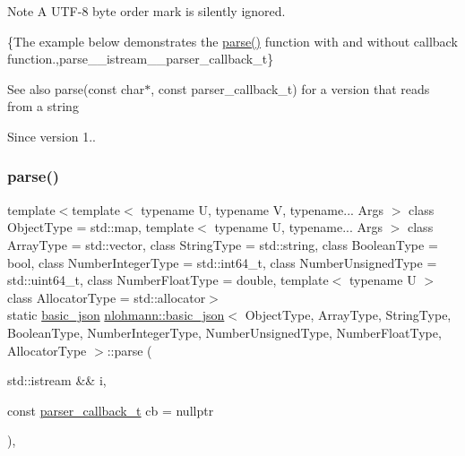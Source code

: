 \begin{DoxyNote}{Note}
A U\+T\+F-\/8 byte order mark is silently ignored.
\end{DoxyNote}
\{The example below demonstrates the {\ttfamily \hyperlink{classnlohmann_1_1basic__json_ace63ac4eb1dd7251a259d32e397461a3}{parse()}} function with and without callback function.,parse\+\_\+\+\_\+istream\+\_\+\+\_\+parser\+\_\+callback\+\_\+t\}

\begin{DoxySeeAlso}{See also}
parse(const char$\ast$, const parser\+\_\+callback\+\_\+t) for a version that reads from a string
\end{DoxySeeAlso}
\begin{DoxySince}{Since}
version 1.. 
\end{DoxySince}
\hypertarget{classnlohmann_1_1basic__json_a959bc32fc72a76cd5a1bd6977926f787}{}\label{classnlohmann_1_1basic__json_a959bc32fc72a76cd5a1bd6977926f787} 
\subsubsection{\texorpdfstring{parse()}{parse()}\hspace{0.1cm}{\footnotesize\ttfamily [4/6]}}
{\footnotesize\ttfamily template$<$template$<$ typename U, typename V, typename... Args $>$ class Object\+Type = std\+::map, template$<$ typename U, typename... Args $>$ class Array\+Type = std\+::vector, class String\+Type  = std\+::string, class Boolean\+Type  = bool, class Number\+Integer\+Type  = std\+::int64\+\_\+t, class Number\+Unsigned\+Type  = std\+::uint64\+\_\+t, class Number\+Float\+Type  = double, template$<$ typename U $>$ class Allocator\+Type = std\+::allocator$>$ \\
static \hyperlink{classnlohmann_1_1basic__json}{basic\+\_\+json} \hyperlink{classnlohmann_1_1basic__json}{nlohmann\+::basic\+\_\+json}$<$ Object\+Type, Array\+Type, String\+Type, Boolean\+Type, Number\+Integer\+Type, Number\+Unsigned\+Type, Number\+Float\+Type, Allocator\+Type $>$\+::parse (\begin{DoxyParamCaption}\item[{std\+::istream \&\&}]{i,  }\item[{const \hyperlink{classnlohmann_1_1basic__json_a9e35475e2027520a78e09f460dbe048a}{parser\+\_\+callback\+\_\+t}}]{cb = {\ttfamily nullptr} }\end{DoxyParamCaption})\hspace{0.3cm}{\ttfamily [inline]}, {\ttfamily [static]}}



